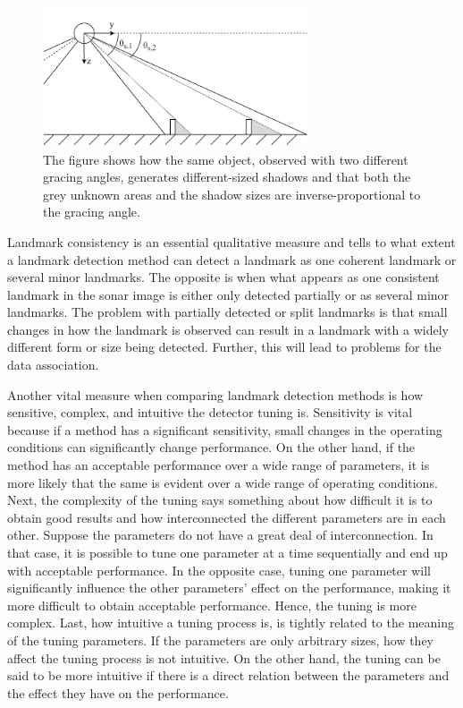 \begin{figure}
    \centering
    \includegraphics[width=0.7\textwidth]{figures/object_shadow.drawio.pdf}
    \caption{The figure shows how the same object, observed with two different gracing angles, generates different-sized shadows and that both the grey unknown areas and the shadow sizes are inverse-proportional to the gracing angle.}
    \label{fig:object_shadow}
\end{figure}

Landmark consistency is an essential qualitative measure and tells to what extent a landmark detection method can detect a landmark as one coherent landmark or several minor landmarks. The opposite is when what appears as one consistent landmark in the sonar image is either only detected partially or as several minor landmarks. The problem with partially detected or split landmarks is that small changes in how the landmark is observed can result in a landmark with a widely different form or size being detected. Further, this will lead to problems for the data association. 

Another vital measure when comparing landmark detection methods is how sensitive, complex, and intuitive the detector tuning is. Sensitivity is vital because if a method has a significant sensitivity, small changes in the operating conditions can significantly change performance. On the other hand, if the method has an acceptable performance over a wide range of parameters, it is more likely that the same is evident over a wide range of operating conditions. Next, the complexity of the tuning says something about how difficult it is to obtain good results and how interconnected the different parameters are in each other. Suppose the parameters do not have a great deal of interconnection. In that case, it is possible to tune one parameter at a time sequentially and end up with acceptable performance. In the opposite case, tuning one parameter will significantly influence the other parameters' effect on the performance, making it more difficult to obtain acceptable performance. Hence, the tuning is more complex. Last, how intuitive a tuning process is, is tightly related to the meaning of the tuning parameters. If the parameters are only arbitrary sizes, how they affect the tuning process is not intuitive. On the other hand, the tuning can be said to be more intuitive if there is a direct relation between the parameters and the effect they have on the performance.     

